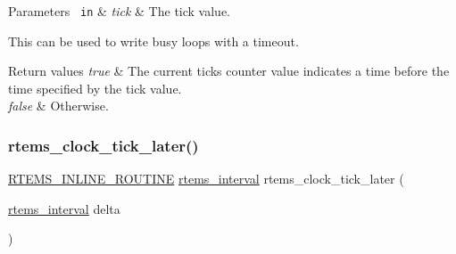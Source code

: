 \begin{DoxyParams}[1]{Parameters}
\mbox{\texttt{ in}}  & {\em tick} & The tick value.\\
\hline
\end{DoxyParams}
This can be used to write busy loops with a timeout.


\begin{DoxyCode}{0}
\DoxyCodeLine{\{}
\DoxyCodeLine{}
\DoxyCodeLine{  \textcolor{keywordflow}{do} \{}
\DoxyCodeLine{    \}}
\DoxyCodeLine{}
\DoxyCodeLine{\}}
\end{DoxyCode}



\begin{DoxyRetVals}{Return values}
{\em true} & The current ticks counter value indicates a time before the time specified by the tick value. \\
\hline
{\em false} & Otherwise. \\
\hline
\end{DoxyRetVals}
\mbox{\label{group__ClassicClock_gac8c07d906bfea4f56f5c7a46a79336c0}} 
\subsubsection{\texorpdfstring{rtems\_clock\_tick\_later()}{rtems\_clock\_tick\_later()}}
{\footnotesize\ttfamily \mbox{\hyperlink{group__RTEMSScoreBaseDefs_gac216239df231d5dbd15e3520b0b9313f}{R\+T\+E\+M\+S\+\_\+\+I\+N\+L\+I\+N\+E\+\_\+\+R\+O\+U\+T\+I\+NE}} \mbox{\hyperlink{group__ClassicTasks_gad39c43f949683d46874e3a5586b93aee}{rtems\+\_\+interval}} rtems\+\_\+clock\+\_\+tick\+\_\+later (\begin{DoxyParamCaption}\item[{\mbox{\hyperlink{group__ClassicTasks_gad39c43f949683d46874e3a5586b93aee}{rtems\+\_\+interval}}}]{delta }\end{DoxyParamCaption})}




